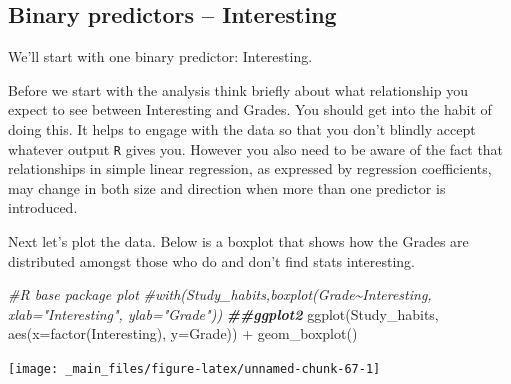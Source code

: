 \documentclass[
]{gitbook}
\newenvironment{Shaded}{\begin{snugshade}}{\end{snugshade}}
\newcommand{\AttributeTok}[1]{\textcolor[rgb]{0.77,0.63,0.00}{#1}}
\newcommand{\CommentTok}[1]{\textcolor[rgb]{0.56,0.35,0.01}{\textit{#1}}}
\newcommand{\DocumentationTok}[1]{\textcolor[rgb]{0.56,0.35,0.01}{\textbf{\textit{#1}}}}
\newcommand{\FunctionTok}[1]{\textcolor[rgb]{0.00,0.00,0.00}{#1}}
\newcommand{\NormalTok}[1]{#1}
\newcommand{\SpecialCharTok}[1]{\textcolor[rgb]{0.00,0.00,0.00}{#1}}
\begin{document}
\hypertarget{binary-predictors-interesting}{%
\subsection{Binary predictors -- Interesting}\label{binary-predictors-interesting}}

We'll start with one binary predictor: Interesting.

Before we start with the analysis think briefly about what relationship you expect to see between Interesting and Grades. You should get into the habit of doing this. It helps to engage with the data so that you don't blindly accept whatever output \texttt{R} gives you. However you also need to be aware of the fact that relationships in simple linear regression, as expressed by regression coefficients, may change in both size and direction when more than one predictor is introduced.


Next let's plot the data. Below is a boxplot that shows how the Grades are distributed amongst those who do and don't find stats interesting.

\begin{Shaded}
\begin{Highlighting}[]
\CommentTok{\#R base package plot}
\CommentTok{\#with(Study\_habits,boxplot(Grade\textasciitilde{}Interesting, xlab="Interesting", ylab="Grade"))}
\DocumentationTok{\#\#ggplot2}
\FunctionTok{ggplot}\NormalTok{(Study\_habits, }\FunctionTok{aes}\NormalTok{(}\AttributeTok{x=}\FunctionTok{factor}\NormalTok{(Interesting), }\AttributeTok{y=}\NormalTok{Grade)) }\SpecialCharTok{+} \FunctionTok{geom\_boxplot}\NormalTok{()}
\end{Highlighting}
\end{Shaded}

\begin{center}\texttt{[image: \_main\_files/figure-latex/unnamed-chunk-67-1]} \end{center}

\end{document}
